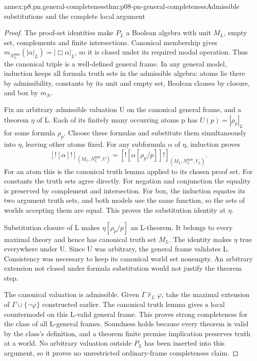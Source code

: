 \begin{annexitem}{annex:p8.pn.general-completeness}{thm:p08-pn-general-completeness}{Admissible substitutions and the complete local argument}
\begin{proof}
The proof-set identities make \(P_L\) a Boolean algebra with
unit \(M_L\), empty set, complements and finite intersections.
Canonical membership gives
\(m_{N_L^{\min}}(|\alpha|_L)=|\Box\alpha|_L\), so it
is closed under its required modal operation. Thus the canonical
triple is a well-defined general frame. In any general model,
induction keeps all formula truth sets in the admissible algebra:
atoms lie there by admissibility, constants by its unit and empty
set, Boolean clauses by closure, and box by \(m_N\).

Fix an arbitrary admissible valuation U on the canonical general
frame, and a theorem \(\eta\) of L. Each of its finitely
many occurring atoms p has \(U(p)=|\rho_p|_L\) for some
formula \(\rho_p\). Choose these formulas and substitute them
simultaneously into \(\eta\), leaving other atoms fixed.
For any subformula \(\alpha\) of \(\eta\), induction proves
\[
 [![\alpha]!]_{(M_L,N_L^{\min},U)}
   =[![\alpha[\rho_p/p]]!]_{(M_L,N_L^{\min},V_L)}.
\]
For an atom this is the canonical truth lemma applied to its
chosen proof set. For constants the truth sets agree directly.
For negation and conjunction the equality is preserved by
complement and intersection. For box, the induction equates its
two argument truth sets, and both models use the same function,
so the sets of worlds accepting them are equal. This proves the
substitution identity at \(\eta\).

Substitution closure of L makes \(\eta[\rho_p/p]\) an
L-theorem. It belongs to every maximal theory and hence has
canonical truth set \(M_L\). The identity makes \(\eta\)
true everywhere under U. Since U was arbitrary, the general
frame validates L. Consistency was necessary to keep its
canonical world set nonempty. An arbitrary extension not closed
under formula substitution would not justify the theorem step.

The canonical valuation is admissible. Given
\(\Gamma\not\vdash_L\varphi\), take the maximal extension
of \(\Gamma\cup\{\neg\varphi\}\) constructed earlier.
The canonical truth lemma gives a local countermodel on this
L-valid general frame. This proves strong completeness for the
class of all L-general frames. Soundness holds because every
theorem is valid by the class's definition, and a theorem finite
premise implication preserves truth at a world. No arbitrary
valuation outside \(P_L\) has been inserted into this argument,
so it proves no unrestricted ordinary-frame completeness claim.
\end{proof}
\end{annexitem}
